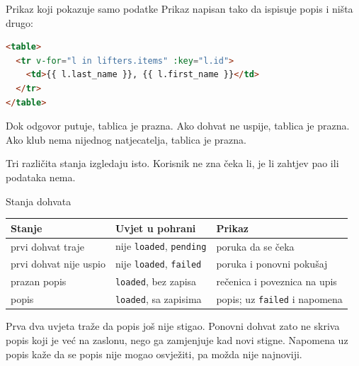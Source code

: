
\begin{frame}[fragile]{Prikaz koji pokazuje samo podatke}
Prikaz napisan tako da ispisuje popis i ništa drugo:

\begin{lstlisting}[language=html]
<table>
  <tr v-for="l in lifters.items" :key="l.id">
    <td>{{ l.last_name }}, {{ l.first_name }}</td>
  </tr>
</table>
\end{lstlisting}

\vspace{0.5em}
Dok odgovor putuje, tablica je prazna. Ako dohvat ne uspije, tablica je prazna. Ako klub nema nijednog natjecatelja, tablica je prazna.

\vspace{0.5em}
Tri različita stanja izgledaju isto. Korisnik ne zna čeka li, je li zahtjev pao ili podataka nema.
\end{frame}

\begin{frame}{Stanja dohvata}
\vspace{0.3em}
\begin{center}
{\small
\setlength{\tabcolsep}{5pt}
\renewcommand{\arraystretch}{1.4}
\begin{tabular}{@{}L{3.4cm}L{3.7cm}L{4.9cm}@{}}
  \toprule
  \textbf{Stanje} & \textbf{Uvjet u pohrani} & \textbf{Prikaz} \\
  \midrule
  prvi dohvat traje & nije \texttt{loaded}, \texttt{pending} & poruka da se čeka \\
  prvi dohvat nije uspio & nije \texttt{loaded}, \texttt{failed} & poruka i ponovni pokušaj \\
  prazan popis & \texttt{loaded}, bez zapisa & rečenica i poveznica na upis \\
  popis & \texttt{loaded}, sa zapisima & popis; uz \texttt{failed} i napomena \\
  \bottomrule
\end{tabular}
}
\end{center}

\vspace{0.6em}
Prva dva uvjeta traže da popis još nije stigao. Ponovni dohvat zato ne skriva popis koji je već na zaslonu, nego ga zamjenjuje kad novi stigne. Napomena uz popis kaže da se popis nije mogao osvježiti, pa možda nije najnoviji.
\end{frame}

